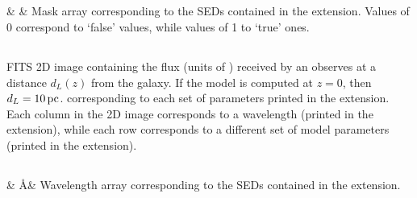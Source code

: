\documentclass[a4paper,11pt,twoside]{article}
\begin{document}

\subsection{}

\begin{fits_table}

    &   & Mask array corresponding to the SEDs contained in the  extension. Values of 0 correspond to `false' values, while values of 1 to `true' ones. \\

\end{fits_table}



\subsection{}

FITS 2D image containing the flux (units of \FlUnits) received by an observes at a distance $d_L(z)$ from the galaxy. If the model is computed at $z=0$, then $d_L=10\, \textnormal{pc}$.  corresponding to each set of parameters printed in the  extension. Each column in the 2D image corresponds to a wavelength (printed in the  extension), while each row corresponds to a different set of model parameters (printed in the  extension).

\subsection{}

\begin{fits_table}
     
    &  \AA & Wavelength array corresponding to the SEDs contained in the  extension. \\
   
\end{fits_table}


\subsection{}
\end{document}
